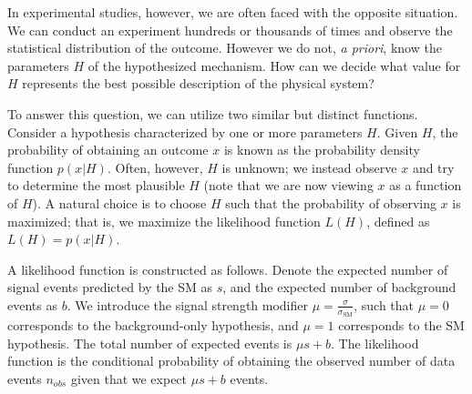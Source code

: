 In experimental studies, however, we are often faced with the opposite
situation. We can conduct an experiment hundreds or thousands of times and
observe the statistical distribution of the outcome. However we do not,
\textit{a priori}, know the parameters $H$ of the hypothesized mechanism. How
can we decide what value for $H$ represents the best possible description of the
physical system?

To answer this question, we can utilize two similar but distinct functions.
Consider a hypothesis characterized by one or more parameters $H$. Given $H$,
the probability of obtaining an outcome $x$ is known as the probability density
function $p(x|H)$. Often, however, $H$ is unknown; we instead observe $x$ and
try to determine the most plausible $H$ (note that we are now viewing $x$ as a
function of $H$). A natural choice is to choose $H$ such that the probability of
observing $x$ is maximized; that is, we maximize the likelihood function $L(H)$,
defined as $L(H) = p(x|H)$.

A likelihood function is constructed as follows. Denote the expected number of
signal events predicted by the SM as $s$, and the expected number of background
events as $b$. We introduce the signal strength modifier
$\mu=\frac{\sigma}{\sigma_\text{SM}}$, such that $\mu=0$ corresponds to the
background-only hypothesis, and $\mu=1$ corresponds to the SM hypothesis. The
total number of expected events is $\mu s + b$. The likelihood function is the
conditional probability of obtaining the observed number of data events
$n_{obs}$ given that we expect $\mu s + b$ events.

